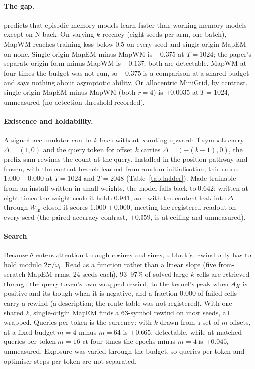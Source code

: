 \documentclass[10pt]{article}
\begin{document}
\paragraph{The gap.} \citet{whittington2025tale} predicts that episodic-memory models learn faster than
working-memory models except on N-back. On varying-$k$ recency (eight seeds per arm, one batch), MapWM reaches
training loss below 0.5 on every seed and single-origin MapEM on none. Single-origin MapEM minus MapWM is $-0.375$
at $T=1024$; the paper's separate-origin form minus MapWM is $-0.137$; both are detectable. MapWM at four times the budget was not run, so $-0.375$ is a comparison at a shared budget and says
nothing about asymptotic ability. On allocentric MiniGrid, by contrast, single-origin MapEM minus MapWM (both
$r=4$) is $+0.0035$ at $T=1024$, unmeasured (no detection threshold recorded).

\paragraph{Existence and holdability.} A signed accumulator can do $k$-back without counting upward: if symbols
carry $\Delta=(1,0)$ and the query token for offset $k$ carries $\Delta=(-(k-1),0)$, the prefix sum rewinds the count
at the query. Installed in the position pathway and frozen, with the content branch learned from random
initialisation, this scores $1.000\pm0.000$ at $T=1024$ and $T=2048$ (Table~\ref{tab:ladder}). Made
trainable from an install written in small weights, the model falls back to $0.642$; written at eight times the
weight scale it holds $0.941$, and with the content leak into $\Delta$ through $W_{\mathrm{in}}$ closed it scores
$1.000\pm0.000$, meeting the registered readout on every seed (the paired accuracy contrast, $+0.059$, is at
ceiling and unmeasured).

\paragraph{Search.} Because $\theta$ enters attention through cosines and sines, a block's rewind only has to hold
modulo $2\pi/\omega_i$. Read as a function rather than a linear slope (five from-scratch MapEM arms, 24 seeds each),
93--97\% of solved large-$k$ cells are retrieved through the query token's own wrapped rewind, to the kernel's peak
when $A_X$ is positive and its trough when it is negative, and a fraction $0.000$ of failed cells carry a rewind (a
description; the route table was not registered). With one shared $k$, single-origin MapEM finds a 63-symbol rewind
on most seeds, all wrapped. Queries per token is the currency: with $k$ drawn from a set of $m$ offsets, at a fixed
budget $m=4$ minus $m=64$ is $+0.665$, detectable, while at matched queries per token $m=16$ at four times
the epochs minus $m=4$ is $+0.045$, unmeasured. Exposure was varied through the budget, so queries
per token and optimiser steps per token are not separated.
\end{document}
